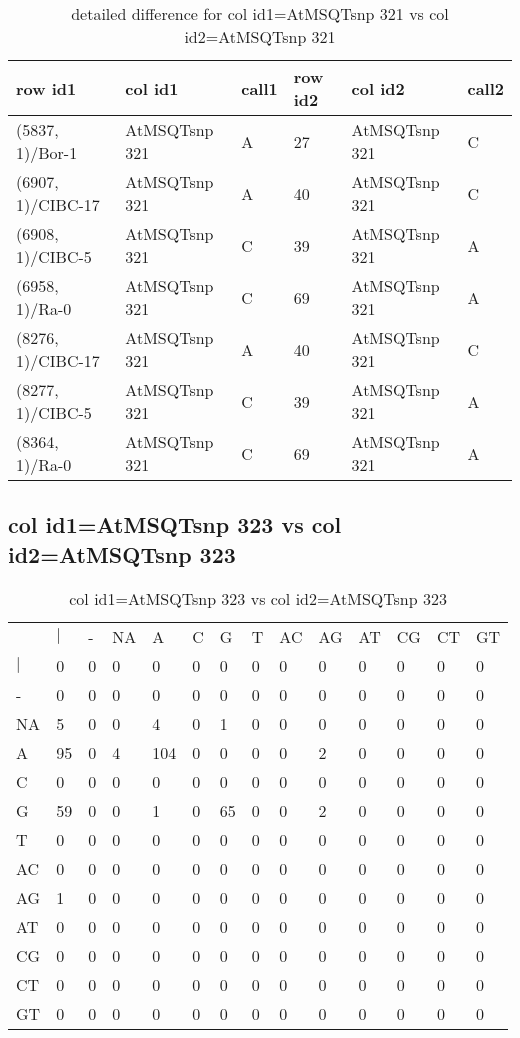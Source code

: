 \begin{center}
\begin{longtable}{|l|l|l|l|l|l|}
\caption{detailed difference for col id1=AtMSQTsnp 321 vs col id2=AtMSQTsnp 321} \label{table_dm857}\\
\hline
row id1&col id1&call1&row id2&col id2&call2\\
\hline
(5837, 1)/Bor-1&AtMSQTsnp 321&A&27&AtMSQTsnp 321&C\\
(6907, 1)/CIBC-17&AtMSQTsnp 321&A&40&AtMSQTsnp 321&C\\
(6908, 1)/CIBC-5&AtMSQTsnp 321&C&39&AtMSQTsnp 321&A\\
(6958, 1)/Ra-0&AtMSQTsnp 321&C&69&AtMSQTsnp 321&A\\
(8276, 1)/CIBC-17&AtMSQTsnp 321&A&40&AtMSQTsnp 321&C\\
(8277, 1)/CIBC-5&AtMSQTsnp 321&C&39&AtMSQTsnp 321&A\\
(8364, 1)/Ra-0&AtMSQTsnp 321&C&69&AtMSQTsnp 321&A\\
\hline
\end{longtable}
\end{center}

\subsection{col id1=AtMSQTsnp 323 vs col id2=AtMSQTsnp 323}
\begin{center}
\begin{longtable}{|l|l|l|l|l|l|l|l|l|l|l|l|l|l|}
\caption{col id1=AtMSQTsnp 323 vs col id2=AtMSQTsnp 323} \label{table_dm858}\\
\hline
\\
\hline
&$|$&-&NA&A&C&G&T&AC&AG&AT&CG&CT&GT\\
$|$&0&0&0&0&0&0&0&0&0&0&0&0&0\\
-&0&0&0&0&0&0&0&0&0&0&0&0&0\\
NA&5&0&0&4&0&1&0&0&0&0&0&0&0\\
A&95&0&4&104&0&0&0&0&2&0&0&0&0\\
C&0&0&0&0&0&0&0&0&0&0&0&0&0\\
G&59&0&0&1&0&65&0&0&2&0&0&0&0\\
T&0&0&0&0&0&0&0&0&0&0&0&0&0\\
AC&0&0&0&0&0&0&0&0&0&0&0&0&0\\
AG&1&0&0&0&0&0&0&0&0&0&0&0&0\\
AT&0&0&0&0&0&0&0&0&0&0&0&0&0\\
CG&0&0&0&0&0&0&0&0&0&0&0&0&0\\
CT&0&0&0&0&0&0&0&0&0&0&0&0&0\\
GT&0&0&0&0&0&0&0&0&0&0&0&0&0\\
\hline
\end{longtable}
\end{center}

